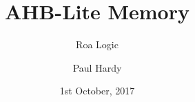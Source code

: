
\usepackage{pkg/roalogictitle}



\title{AHB-Lite Memory}
\author{Roa Logic}
\date{1st October, 2017}
\author{Paul Hardy}

 
\pagestyle{fancy}
\fancyhf{}



\fancyhead[R]{\thepage}
